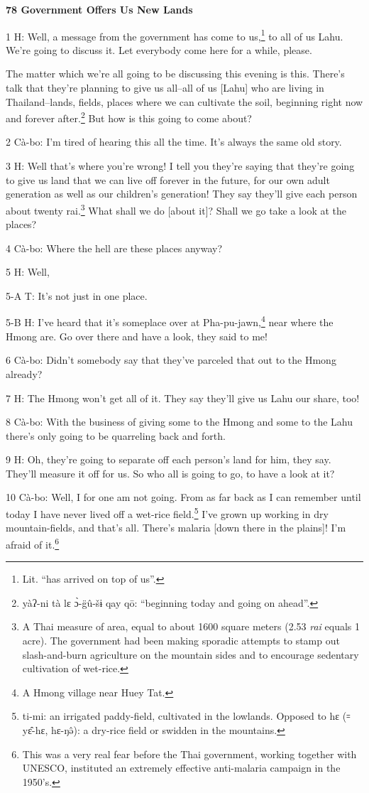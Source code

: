 
\textbf{78 Government Offers Us New Lands}

1 H: Well, a message from the government has come to us,\footnote{Lit. ``has arrived on top of us''.} to all of us Lahu.
We're going to discuss it. Let everybody come here for a while, please.

The matter which we're all going to be discussing this evening is this. There's
talk that they're planning to give us all--all of us [Lahu] who are living in Thailand--lands,
fields, places where we can cultivate the soil, beginning right now and forever
after.\footnote{yàʔ-ni tà lɛ ɔ̀-g̈û-šɨ qay qō: ``beginning today and going on ahead''.} But how is this going to come about?

2 Cà-bo: I'm tired of hearing this all the time. It's always the same old story.

3 H: Well that's where you're wrong! I tell you they're saying that they're going
to give us land that we can live off forever in the future, for our own adult generation
as well as our children's generation! They say they'll give each person about twenty
rai.\footnote{A Thai measure of area, equal to about 1600 square meters (2.53  \textit{rai } equals 1 acre). The government had been making sporadic attempts to stamp out slash-and-burn agriculture on the mountain sides and to encourage sedentary cultivation of wet-rice.} What shall we do [about it]? Shall we go take a look at the places?

4 Cà-bo: Where the hell are these places anyway?

5 H: Well,

5-A T: It's not just in one place.

5-B H: I've heard that it's someplace over at Pha-pu-jawn,\footnote{A Hmong village near Huey Tat.} near where the Hmong
are. Go over there and have a look, they said to me!

6 Cà-bo: Didn't somebody say that they've parceled that out to the Hmong already?

7 H: The Hmong won't get all of it. They say they'll give us Lahu our share, too!

8 Cà-bo: With the business of giving some to the Hmong and some to the Lahu there's
only going to be quarreling back and forth.

9 H: Oh, they're going to separate off each person's land for him, they say. They'll
measure it off for us. So who all is going to go, to have a look at it?

10 Cà-bo: Well, I for one am not going. From as far back as I can remember until
today I have never lived off a wet-rice field.\footnote{ti-mi: an irrigated paddy-field, cultivated in the lowlands. Opposed to hɛ (꞊ yɛ̂-hɛ, hɛ-ŋə̂): a dry-rice field or swidden in the mountains.} I've grown up working in dry
mountain-fields, and that's all. There's malaria [down there in the plains]! I'm
afraid of it.\footnote{This was a very real fear before the Thai government, working together with UNESCO, instituted an extremely effective anti-malaria campaign in the 1950's.}

